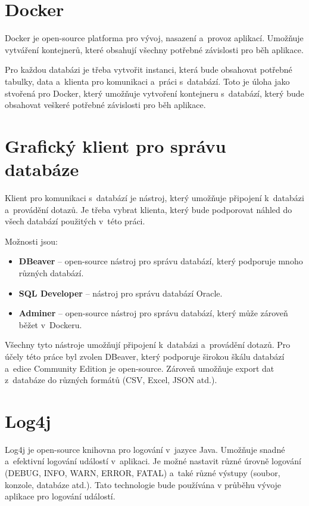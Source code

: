\section{Docker}
Docker je open-source platforma pro vývoj, nasazení a~provoz aplikací.
Umožňuje vytváření kontejnerů, které obsahují všechny potřebné závislosti pro běh aplikace.

Pro každou databázi je třeba vytvořit instanci, která bude obsahovat potřebné tabulky, data
a~klienta pro komunikaci a~práci s~databází. Toto je úloha jako stvořená pro Docker,
který umožňuje vytvoření kontejneru s~databází, který bude obsahovat veškeré potřebné závislosti
pro běh aplikace.
\cite{docker}

\section{Grafický klient pro správu databáze}
Klient pro komunikaci s~databází je nástroj, který umožňuje připojení k~databázi a~provádění dotazů.
Je třeba vybrat klienta, který bude podporovat náhled do všech databází použitých v~této práci.

Možnosti jsou:
\begin{itemize}
    \item \textbf{DBeaver} -- open-source nástroj pro správu databází, který podporuje mnoho různých databází.
    \item \textbf{SQL Developer} -- nástroj pro správu databází Oracle.
    \item \textbf{Adminer} -- open-source nástroj pro správu databází, který může zároveň běžet v~Dockeru.
\end{itemize}

Všechny tyto nástroje umožňují připojení k~databázi a~provádění dotazů.
Pro účely této práce byl zvolen DBeaver, který podporuje širokou škálu databází a~edice Community Edition je open-source.
Zároveň umožňuje export dat z~databáze do různých formátů (CSV, Excel, JSON atd.).
\cite{dbeaver}

\section{Log4j}
Log4j je open-source knihovna pro logování v~jazyce Java.
Umožňuje snadné a~efektivní logování událostí v~aplikaci.
Je možné nastavit různé úrovně logování (DEBUG, INFO, WARN, ERROR, FATAL) a~také různé výstupy
(soubor, konzole, databáze atd.).
Tato technologie bude používána v průběhu vývoje aplikace pro logování událostí.
\cite{log4j}